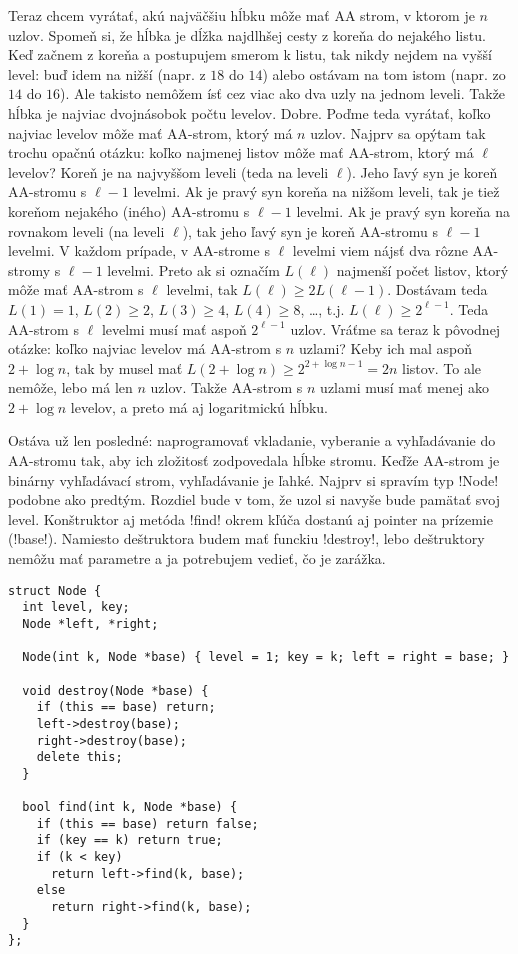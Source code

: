Teraz chcem vyrátať, akú najväčšiu hĺbku môže mať AA strom, v ktorom je $n$ uzlov. Spomeň si,
že hĺbka je dĺžka najdlhšej cesty z koreňa do nejakého listu. Keď začnem z koreňa a postupujem
smerom k listu, tak nikdy nejdem na vyšší level: buď idem na nižší (napr. z $18$ do
$14$) alebo ostávam na tom istom (napr. zo $14$ do $16$). Ale takisto nemôžem ísť
cez viac ako dva uzly na jednom leveli. Takže hĺbka je najviac dvojnásobok počtu levelov.
Dobre. Poďme teda vyrátať, koľko najviac levelov môže mať AA-strom, ktorý má $n$ uzlov. 
Najprv sa opýtam tak trochu opačnú otázku: 
koľko najmenej listov môže mať AA-strom, ktorý má $\ell$ levelov?
Koreň je na najvyššom leveli (teda na leveli $\ell$). 
Jeho ľavý syn je koreň AA-stromu s $\ell-1$ levelmi. Ak je
pravý syn koreňa na nižšom leveli, tak je tiež
koreňom nejakého (iného) AA-stromu s $\ell-1$ levelmi.
Ak je pravý syn koreňa na rovnakom leveli (na leveli $\ell$), tak jeho ľavý syn je koreň 
AA-stromu s $\ell-1$ levelmi. V každom prípade, v AA-strome s $\ell$ levelmi
viem nájsť dva rôzne AA-stromy
s $\ell-1$ levelmi. Preto ak si označím $L(\ell)$ najmenší počet listov, ktorý môže
mať AA-strom s $\ell$ levelmi, tak $L(\ell)\ge2L(\ell-1)$.
Dostávam teda $L(1)=1$, $L(2)\ge2$, $L(3)\ge4$, $L(4)\ge8$, \ldots, t.j. 
$L(\ell)\ge2^{\ell-1}$. Teda AA-strom s $\ell$ levelmi musí mať aspoň $2^{\ell-1}$
uzlov. Vráťme sa teraz k pôvodnej otázke: koľko najviac levelov má AA-strom s $n$ uzlami?
Keby ich mal aspoň $2+\log n$, tak by musel mať 
$L(2+\log n)\ge2^{2+\log n-1}=2n$ listov. To ale nemôže, lebo má len $n$ uzlov. Takže
AA-strom s $n$ uzlami musí mať menej ako $2+\log n$ levelov, a preto má aj logaritmickú hĺbku.


Ostáva už len posledné: naprogramovať vkladanie, vyberanie a vyhľadávanie do AA-stromu tak,
aby ich zložitosť zodpovedala hĺbke stromu. Keďže AA-strom je binárny vyhľadávací strom,
vyhľadávanie je ľahké. Najprv si spravím typ \prg!Node! podobne ako predtým. Rozdiel
bude v tom, že uzol si navyše bude pamätať svoj level. Konštruktor aj metóda
\prg!find! okrem kľúča dostanú aj pointer na prízemie (\prg!base!).
Namiesto deštruktora budem mať funckiu \prg!destroy!, lebo deštruktory nemôžu
mať parametre a ja potrebujem vedieť, čo je zarážka.


\begin{lstlisting}
struct Node {
  int level, key;
  Node *left, *right;

  Node(int k, Node *base) { level = 1; key = k; left = right = base; }

  void destroy(Node *base) {
    if (this == base) return;
    left->destroy(base);
    right->destroy(base);
    delete this;
  }

  bool find(int k, Node *base) {
    if (this == base) return false;
    if (key == k) return true;
    if (k < key)
      return left->find(k, base);
    else
      return right->find(k, base);
  }
};
\end{lstlisting}

